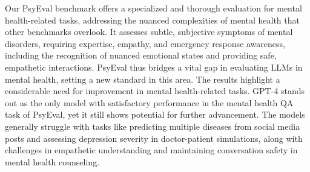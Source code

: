 Our PsyEval benchmark offers a specialized and thorough evaluation for mental health-related tasks, addressing the nuanced complexities of mental health that other benchmarks overlook. It assesses subtle, subjective symptoms of mental disorders, requiring expertise, empathy, and emergency response awareness, including the recognition of nuanced emotional states and providing safe, empathetic interactions. PsyEval thus bridges a vital gap in evaluating LLMs in mental health, setting a new standard in this area.
The results highlight a considerable need for improvement in mental health-related tasks. GPT-4 stands out as the only model with satisfactory performance in the mental health QA task of PsyEval, yet it still shows potential for further advancement. The models generally struggle with tasks like predicting multiple diseases from social media posts and assessing depression severity in doctor-patient simulations, along with challenges in empathetic understanding and maintaining conversation safety in mental health counseling.